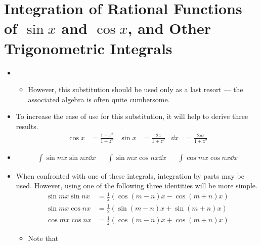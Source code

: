 \documentclass[../main.tex]{subfiles}
\begin{document}
\section{Integration of Rational Functions of \texorpdfstring{$\sin x$}{TEXT} and \texorpdfstring{$\cos x$}{TEXT}, and Other Trigonometric Integrals}
\begin{itemize}
    \item {}
    \begin{itemize}
        \item However, this substitution should be used only as a last resort --- the associated algebra is often quite cumbersome.
    \end{itemize}
    \item To increase the ease of use for this substitution, it will help to derive three results.
    \begin{align*}
        \cos x &= \frac{1-z^2}{1+z^2}&
        \sin x &= \frac{2z}{1+z^2}&
        \dd x &= \frac{2\dd{z}}{1+z^2}
    \end{align*}
    \item {}
    \begin{align*}
        \int\sin mx\sin nx\dd{x}&&
        \int\sin mx\cos nx\dd{x}&&
        \int\cos mx\cos nx\dd{x}
    \end{align*}
    \item When confronted with one of these integrals, integration by parts may be used. However, using one of the following three identities will be more simple.
    \begin{align*}
        \sin mx\sin nx &= \frac{1}{2}(\cos(m-n)x-\cos(m+n)x)\\
        \sin mx\cos nx &= \frac{1}{2}(\sin(m-n)x+\sin(m+n)x)\\
        \cos mx\cos nx &= \frac{1}{2}(\cos(m-n)x+\cos(m+n)x)
    \end{align*}
    \begin{itemize}
        \item Note that 
    \end{itemize}
\end{itemize}
\end{document}
